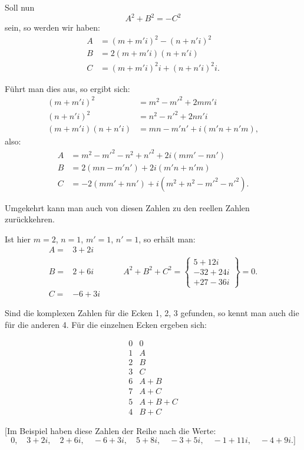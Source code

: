 
Soll nun
\[
A^2 + B^2 = -C^2
\]
sein, so werden wir haben:
\[\begin{aligned}
A &= (m+m'i)^2 - (n+n'i)^2 \\
B &= 2(m+m'i)(n+n'i) \\
C &= (m+m'i)^2 i + (n+n'i)^2 i.
\end{aligned}\]

Führt man dies aus, so ergibt sich:
\[\begin{aligned}
(m+m'i)^2 &= m^2 - m'^2 + 2mm'i \\
(n+n'i)^2 &= n^2 - n'^2 + 2nn'i \\
(m+m'i)(n+n'i) &= mn - m'n' + i(m'n+n'm),
\end{aligned}\]
also:
\[\begin{aligned}
A &= m^2 - m'^2 - n^2 + n'^2 + 2i(mm' - nn') \\
B &= 2(mn - m'n') + 2i(m'n+n'm) \\
C &= -2(mm'+nn') + i(m^2+n^2-m'^2-n'^2).
\end{aligned}\]

Umgekehrt kann man auch von diesen Zahlen zu den reellen Zahlen zurückkehren.

Ist hier $m = 2$, $n = 1$, $m' = 1$, $n' = 1$, so erhält man:
\[
\begin{array}{lcl}
A = & 3+2i & \\
B = & 2+6i & \qquad A^2+B^2+C^2 = \left\{\begin{array}{r} 5+12i \\ -32+24i \\ +27-36i \end{array}\right\} = 0. \\
C = & -6+3i &
\end{array}
\]

 Sind die komplexen Zahlen für die Ecken 1, 2, 3 gefunden, so kennt man auch die für
die anderen 4. Für die einzelnen Ecken ergeben sich:
\begin{center}\begin{minipage}{3.3cm}\[
\begin{array}{cc}
0 & 0 \\
1 & A \\
2 & B \\
3 & C \\
6 & A+B \\
7 & A+C \\
5 & A+B+C \\
4 & B+C
\end{array}
\]

\end{minipage}\hspace{.4cm}\begin{minipage}{7.1cm}\end{minipage}\end{center}

[Im Beispiel haben diese Zahlen der Reihe nach die Werte:
\[
0,\quad 3+2i,\quad 2+6i,\quad -6+3i,\quad 5+8i,\quad -3+5i,\quad -1+11i,\quad -4+9i.]
\]
